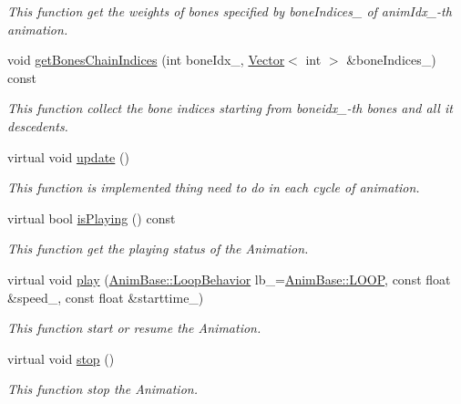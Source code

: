 \begin{DoxyCompactItemize}
\begin{DoxyCompactList}\small\item\em This function get the weights of bones specified by bone\+Indices\+\_\+ of anim\+Idx\+\_\+-\/th animation. \end{DoxyCompactList}\item 
void \hyperlink{class_i_dream_sky_1_1_skeletal_anim_blender_ac27ac3f678bf095440b95ab914dd5ce0}{get\+Bones\+Chain\+Indices} (int bone\+Idx\+\_\+, \hyperlink{class_i_dream_sky_1_1_vector}{Vector}$<$ int $>$ \&bone\+Indices\+\_\+) const 
\begin{DoxyCompactList}\small\item\em This function collect the bone indices starting from boneidx\+\_\+-\/th bones and all it descedents. \end{DoxyCompactList}\item 
virtual void \hyperlink{class_i_dream_sky_1_1_skeletal_anim_blender_ad648bb5f97296b7e5ac203967c32a66b}{update} ()
\begin{DoxyCompactList}\small\item\em This function is implemented thing need to do in each cycle of animation. \end{DoxyCompactList}\item 
virtual bool \hyperlink{class_i_dream_sky_1_1_skeletal_anim_blender_a937aa755ef6e880e7779b3a67afb3ca1}{is\+Playing} () const 
\begin{DoxyCompactList}\small\item\em This function get the playing status of the Animation. \end{DoxyCompactList}\item 
virtual void \hyperlink{class_i_dream_sky_1_1_skeletal_anim_blender_a1cecc3b4cb9a378ff1fac5583cbf7f89}{play} (\hyperlink{class_i_dream_sky_1_1_anim_base_aac1c8b7253df068cf02101dcd4f586e2}{Anim\+Base\+::\+Loop\+Behavior} lb\+\_\+=\hyperlink{class_i_dream_sky_1_1_anim_base_aac1c8b7253df068cf02101dcd4f586e2aa119a43717e821f2708795bd94021ea1}{Anim\+Base\+::\+L\+O\+OP}, const float \&speed\+\_, const float \&starttime\+\_)
\begin{DoxyCompactList}\small\item\em This function start or resume the Animation. \end{DoxyCompactList}\item 
virtual void \hyperlink{class_i_dream_sky_1_1_skeletal_anim_blender_a061b003b7492b5c91e19e4c9aca1621a}{stop} ()
\begin{DoxyCompactList}\small\item\em This function stop the Animation. \end{DoxyCompactList}\item 

\end{DoxyCompactItemize}
